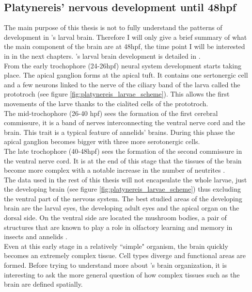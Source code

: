      \subsection{Platynereis' nervous development until 48hpf}
     The main purpose of this thesis is not to fully understand the patterns of development in \platy{}'s larval brain. Therefore I will only give a brief summary of what the main component of the brain are at 48hpf, the time point I will be interested in in the next chapters. \platy{}'s larval brain development is detailed in \cite{Fischer10}.\\
     From the early trochophore (24-26hpf) neural system development starts taking place. The apical ganglion forms at the apical tuft. It contains one sertonergic cell and a few neurons linked to the nerve of the ciliary band of the larva called the prototroch (see figure \ref{fig:platynereis_larvae_scheme}). This allows the first movements of the larve thanks to the cialited cells of the prototroch.\\
     The mid-trochophore (26-40 hpf) sees the formation of the first cerebral commissure, it is a band of nerves interconnecting the ventral nerve cord and the brain. This trait is a typical feature of annelids' brains. During this phase the apical ganglion becomes bigger with three more serotonergic cells.\\
     The late trochophore (40-48hpf) sees the formation of the second commissure in the ventral nerve cord. It is at the end of this stage that the tissues of the brain become more complex with a notable increase in the number of neutrites \cite{Fischer10}.\\
     The data used in the rest of this thesis will not encapsulate the whole larvae, just the developing brain (see figure \ref{fig:platynereis_larvae_scheme}) thus excluding the ventral part of the nervous system. The best studied areas of the developing brain are the larval eyes, the developing adult eyes and the apical organ on the dorsal side. On the ventral side are located the mushroom bodies, a pair of structures that are known to play a role in olfactory learning and memory in insects and annelids \cite{Tomer10}.\\
     
     Even at this early stage in a relatively ``simple" organism, the brain quickly becomes an extremely complex tissue. Cell types diverge and functional areas are formed. Before trying to understand more about \platy{}'s brain organization, it is interesting to ask the more general question of how complex tissues such as the brain are defined spatially.
     
